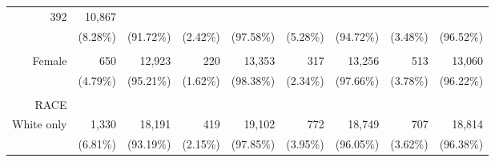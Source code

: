 \documentclass{article}
\begin{document}
\begin{tabular}{lllllllll}
  \multicolumn{1}{r}{392} &
  \multicolumn{1}{r}{10,867} \\
\multicolumn{1}{r}{} &
  \multicolumn{1}{|r}{(8.28\%)} &
  \multicolumn{1}{r}{(91.72\%)} &
  \multicolumn{1}{r}{(2.42\%)} &
  \multicolumn{1}{r}{(97.58\%)} &
  \multicolumn{1}{r}{(5.28\%)} &
  \multicolumn{1}{r}{(94.72\%)} &
  \multicolumn{1}{r}{(3.48\%)} &
  \multicolumn{1}{r}{(96.52\%)} \\
\multicolumn{1}{r}{} &
  \multicolumn{1}{|r}{} &
  \multicolumn{1}{r}{} &
  \multicolumn{1}{r}{} &
  \multicolumn{1}{r}{} &
  \multicolumn{1}{r}{} &
  \multicolumn{1}{r}{} &
  \multicolumn{1}{r}{} &
  \multicolumn{1}{r}{} \\
\multicolumn{1}{r}{Female\hspace{1em}} &
  \multicolumn{1}{|r}{650} &
  \multicolumn{1}{r}{12,923} &
  \multicolumn{1}{r}{220} &
  \multicolumn{1}{r}{13,353} &
  \multicolumn{1}{r}{317} &
  \multicolumn{1}{r}{13,256} &
  \multicolumn{1}{r}{513} &
  \multicolumn{1}{r}{13,060} \\
\multicolumn{1}{r}{} &
  \multicolumn{1}{|r}{(4.79\%)} &
  \multicolumn{1}{r}{(95.21\%)} &
  \multicolumn{1}{r}{(1.62\%)} &
  \multicolumn{1}{r}{(98.38\%)} &
  \multicolumn{1}{r}{(2.34\%)} &
  \multicolumn{1}{r}{(97.66\%)} &
  \multicolumn{1}{r}{(3.78\%)} &
  \multicolumn{1}{r}{(96.22\%)} \\
\multicolumn{1}{r}{} &
  \multicolumn{1}{|r}{} &
  \multicolumn{1}{r}{} &
  \multicolumn{1}{r}{} &
  \multicolumn{1}{r}{} &
  \multicolumn{1}{r}{} &
  \multicolumn{1}{r}{} &
  \multicolumn{1}{r}{} &
  \multicolumn{1}{r}{} \\
\multicolumn{1}{r}{RACE} &
  \multicolumn{1}{|r}{} &
  \multicolumn{1}{r}{} &
  \multicolumn{1}{r}{} &
  \multicolumn{1}{r}{} &
  \multicolumn{1}{r}{} &
  \multicolumn{1}{r}{} &
  \multicolumn{1}{r}{} &
  \multicolumn{1}{r}{} \\
\multicolumn{1}{r}{White only\hspace{1em}} &
  \multicolumn{1}{|r}{1,330} &
  \multicolumn{1}{r}{18,191} &
  \multicolumn{1}{r}{419} &
  \multicolumn{1}{r}{19,102} &
  \multicolumn{1}{r}{772} &
  \multicolumn{1}{r}{18,749} &
  \multicolumn{1}{r}{707} &
  \multicolumn{1}{r}{18,814} \\
\multicolumn{1}{r}{} &
  \multicolumn{1}{|r}{(6.81\%)} &
  \multicolumn{1}{r}{(93.19\%)} &
  \multicolumn{1}{r}{(2.15\%)} &
  \multicolumn{1}{r}{(97.85\%)} &
  \multicolumn{1}{r}{(3.95\%)} &
  \multicolumn{1}{r}{(96.05\%)} &
  \multicolumn{1}{r}{(3.62\%)} &
  \multicolumn{1}{r}{(96.38\%)} \\

\end{tabular}
\end{document}
